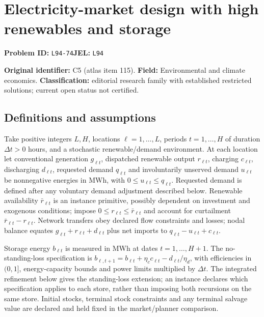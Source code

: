 \documentclass[11pt,a4paper]{article}
\begin{document}
\section*{Electricity-market design with high renewables and storage}
\textbf{Problem ID:} \texttt{L94-74}\quad \textbf{JEL:} \texttt{L94}\par
\label{problem:OP-0115}
\label{audited:ECON-040}


\label{atlas:prob:C5}

\noindent\textbf{Original identifier:} C5 (atlas item 115). \textbf{Field:} Environmental and climate economics. \textbf{Classification:} editorial research family with established restricted solutions; current open status not certified.

\subsection*{Definitions and assumptions}

Take positive integers $L,H$, locations $\ell=1,\ldots,L$, periods $t=1,\ldots,H$ of duration $\Delta t>0$ hours, and a stochastic renewable/demand environment. At each location let conventional generation $g_{\ell t}$, dispatched renewable output $r_{\ell t}$, charging $c_{\ell t}$, discharging $d_{\ell t}$, requested demand $q_{\ell t}$ and involuntarily unserved demand $u_{\ell t}$ be nonnegative energies in MWh, with $0\leq u_{\ell t}\leq q_{\ell t}$. Requested demand is defined after any voluntary demand adjustment described below. Renewable availability $\bar r_{\ell t}$ is an instance primitive, possibly dependent on investment and exogenous conditions; impose $0\leq r_{\ell t}\leq\bar r_{\ell t}$ and account for curtailment $\bar r_{\ell t}-r_{\ell t}$. Network transfers obey declared flow constraints and losses; nodal balance equates $g_{\ell t}+r_{\ell t}+d_{\ell t}$ plus net imports to $q_{\ell t}-u_{\ell t}+c_{\ell t}$.

Storage energy $b_{\ell t}$ is measured in MWh at dates $t=1,\ldots,H+1$. The no-standing-loss specification is $b_{\ell,t+1}=b_{\ell t}+\eta_c c_{\ell t}-d_{\ell t}/\eta_d$, with efficiencies in $(0,1]$, energy-capacity bounds and power limits multiplied by $\Delta t$. The integrated refinement below gives the standing-loss extension; an instance declares which specification applies to each store, rather than imposing both recursions on the same store. Initial stocks, terminal stock constraints and any terminal salvage value are declared and held fixed in the market/planner comparison.
\end{document}
